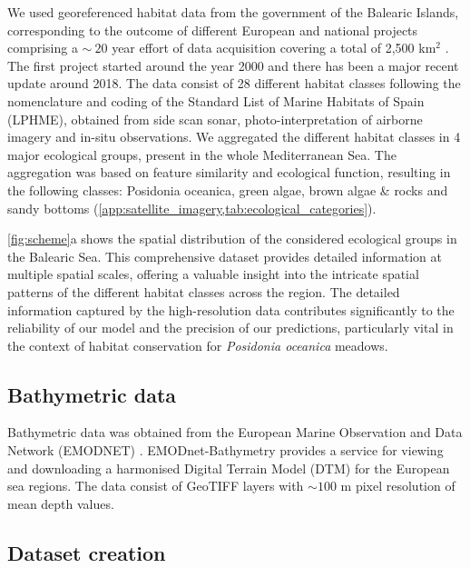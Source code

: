 We used georeferenced habitat data from the government of the Balearic
Islands, corresponding to the outcome of different European and national
projects comprising a $\sim~20$ year effort of data acquisition covering a
total of 2,500 km$^2$ \cite{cartografia,ValleVillalonga2023}.
The first
project started
around the year
2000 and there has been a major recent update around 2018. The data consist of
28 different habitat classes following the nomenclature and coding of the
Standard List of Marine Habitats of Spain (LPHME), obtained from side scan
sonar, photo-interpretation of airborne imagery and in-situ observations. We
aggregated the different habitat classes in 4 major ecological groups, present
in the whole Mediterranean Sea. The aggregation was based on feature similarity
and ecological function, resulting in the following classes: Posidonia
oceanica, green algae, brown algae \& rocks and sandy bottoms
(\cref{app:satellite_imagery,tab:ecological_categories}).

\cref{fig:scheme}a shows the spatial distribution of the considered ecological
groups in the Balearic Sea. This comprehensive dataset provides detailed
information at multiple spatial scales, offering a valuable insight into the
intricate spatial patterns of the different habitat classes across the region.
The detailed information captured by the high-resolution data contributes
significantly to the reliability of our model and the precision of our
predictions, particularly vital in the context of habitat
conservation for \textit{Posidonia oceanica} meadows.

\subsection{Bathymetric data}

Bathymetric data was obtained from the European Marine Observation and Data
Network (EMODNET) \cite{emodnet}. EMODnet-Bathymetry provides a service for
viewing and downloading a harmonised Digital Terrain Model (DTM) for the
European sea regions. The data consist of GeoTIFF layers with $\sim100$ m pixel
resolution of mean depth values.

\subsection{Dataset creation}

